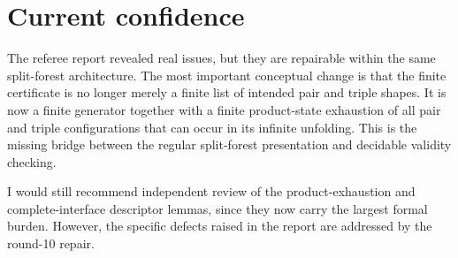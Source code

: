 \documentclass[11pt]{article}
\begin{document}
\section{Current confidence}

The referee report revealed real issues, but they are repairable within the same split-forest architecture.  The most important conceptual change is that the finite certificate is no longer merely a finite list of intended pair and triple shapes.  It is now a finite generator together with a finite product-state exhaustion of all pair and triple configurations that can occur in its infinite unfolding.  This is the missing bridge between the regular split-forest presentation and decidable validity checking.

I would still recommend independent review of the product-exhaustion and complete-interface descriptor lemmas, since they now carry the largest formal burden.  However, the specific defects raised in the report are addressed by the round-10 repair.
\end{document}
